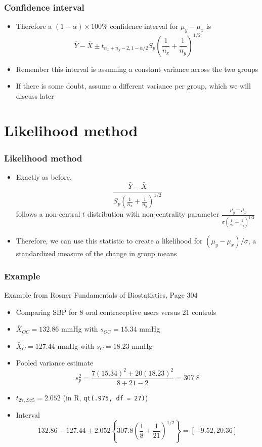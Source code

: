 \documentclass[aspectratio=169]{beamer}
\begin{document}
\begin{frame}\frametitle{Confidence interval}
  \begin{itemize}
  \item Therefore a $(1 - \alpha)\times 100\%$ confidence interval for
    $\mu_y - \mu_x$ is 
    $$
    \bar Y - \bar X \pm t_{n_x + n_y - 2, 1 - \alpha/2}S_p\left(\frac{1}{n_x} + \frac{1}{n_y}\right)^{1/2}
    $$
  \item Remember this interval is assuming a constant variance across the
    two groups
  \item If there is some doubt, assume a different variance per group, which
    we will discuss later
  \end{itemize}
\end{frame}

\section{Likelihood method}
\begin{frame}\frametitle{Likelihood method}
  \begin{itemize}
  \item Exactly as before, 
    $$
    \frac{\bar Y - \bar X}{S_p \left(\frac{1}{n_x} + \frac{1}{n_y}\right)^{1/2}}
    $$
    follows a non-central $t$ distribution with non-centrality parameter
    $\frac{\mu_y - \mu_x}{\sigma  \left(\frac{1}{n_x} + \frac{1}{n_y}\right)^{1/2}}$
  \item Therefore, we can use this statistic to create a likelihood for
    $(\mu_y - \mu_x) / \sigma$, a standardized measure of the change in
    group means
  \end{itemize}
\end{frame}

\begin{frame}\frametitle{Example}
Example from Rosner Fundamentals of Biostatistics, Page 304
\begin{itemize}
\item Comparing SBP for 8 oral contraceptive users versus 21 controls
\item $\bar X_{OC} = 132.86$ mmHg with $s_{OC} = 15.34$ mmHg
\item $\bar X_{C} = 127.44$ mmHg with $s_{C} = 18.23$ mmHg
\item Pooled variance estimate
$$
s_p^2 = \frac{7 (15.34)^2 + 20 (18.23)^2}{8 + 21 - 2} = 307.8
$$ 
\item $t_{27,.975} = 2.052$ (in R, \texttt{qt(.975, df = 27)})
\item Interval
$$
132.86 - 127.44 \pm 2.052 \left\{307.8 \left( \frac{1}{8} + \frac{1}{21}\right)^{1/2} \right\}
= [-9.52, 20.36]
$$
\end{itemize}
\end{frame}
\end{document}
